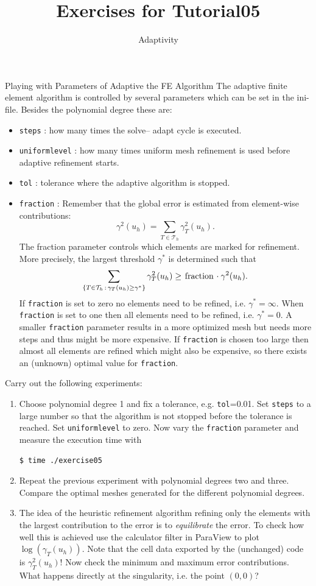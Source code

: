\documentclass[12pt,a4paper]{article}
\title{\textbf{Exercises for Tutorial05}}
\subtitle{Adaptivity}
\begin{document}
\exerciseheader

\begin{Exercise}{Playing with Parameters of Adaptive the FE Algorithm}
The adaptive finite element algorithm is controlled by several parameters
which can be set in the ini-file.
Besides the polynomial degree these are:
\begin{itemize}
\item \lstinline{steps} : how many times the solve-- adapt cycle is executed.
\item \lstinline{uniformlevel} : how many times uniform mesh refinement is used before
adaptive refinement starts.
\item \lstinline{tol} : tolerance where the adaptive algorithm is stopped.
\item \lstinline{fraction} : Remember that the global error is estimated from element-wise
contributions: $$\gamma^2(u_h) = \sum_{T\in \mathcal{T}_h} \gamma_T^2(u_h).$$
The fraction parameter controls which elements are marked for refinement. More precisely,
the largest threshold $\gamma^\ast$ is determined such that
$$\sum_{\{T\in\mathcal{T}_h \,:\, \gamma_T(u_h)\geq\gamma^\ast\}} \gamma_T^2(u_h)
\geq \text{\lstinline{fraction}} \cdot \gamma^2(u_h). $$
If \lstinline{fraction} is set to zero no elements need to be refined, i.e. $\gamma^\ast=\infty$.
When \lstinline{fraction} is set to one then all elements need to be refined, i.e. $\gamma^\ast=0$.
A smaller \lstinline{fraction} parameter results in a more optimized mesh but needs more steps
and thus might be more expensive. If \lstinline{fraction} is chosen too large then almost
all elements are refined which might also be expensive, so there exists an (unknown) optimal
value for \lstinline{fraction}.
\end{itemize}
Carry out the following experiments:
\begin{enumerate}
\item Choose polynomial degree 1 and fix a tolerance, e.g. \lstinline{tol}=0.01.
Set \lstinline{steps} to a large number so that the algorithm is not stopped before the
tolerance is reached. Set \lstinline{uniformlevel} to zero. Now vary the \lstinline{fraction} parameter
and measure the execution time with
\begin{lstlisting}[basicstyle=\ttfamily\small,
frame=single,
backgroundcolor=\color{listingbg}]
$ time ./exercise05
\end{lstlisting}
\item Repeat the previous experiment with polynomial degrees two and three. Compare the optimal
meshes generated for the different polynomial degrees.
\item The idea of the heuristic refinement algorithm refining only the elements with the
largest contribution to the error is to \textit{equilibrate} the error. To check how well this
is achieved use the calculator filter in ParaView to plot $\log(\gamma_T(u_h))$. Note that
the cell data exported by the (unchanged) code is $\gamma_T^2(u_h)$! Now check
the minimum and maximum error contributions. What happens directly at the singularity,
i.e. the point $(0,0)$?
\end{enumerate}
\end{Exercise}
\end{document}
